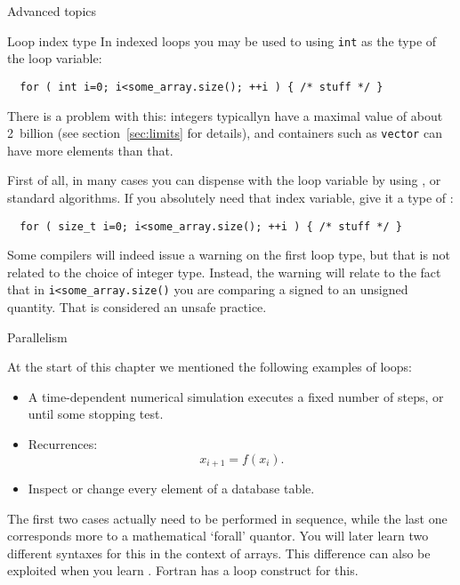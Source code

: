  {Advanced topics}
\label{sec:loop-advanced}

 {Loop index type}
\label{sec:loop-index}
In indexed loops you may be used to using \lstinline{int}
as the type of the loop variable:
\begin{lstlisting}
  for ( int i=0; i<some_array.size(); ++i ) { /* stuff */ }
\end{lstlisting}
There is a problem with this:
integers typicallyn have a maximal value of
about 2~billion (see section~\ref{sec:limits} for details),
and containers such as \lstinline{vector} can have more elements than that.

First of all, in many cases you can dispense with the loop variable
by using ,
or standard algorithms.
If you absolutely need that index variable,
give it a type of :
\begin{lstlisting}
  for ( size_t i=0; i<some_array.size(); ++i ) { /* stuff */ }
\end{lstlisting}

\begin{remark}
  Some compilers will indeed issue a warning on the first loop type,
  but that is not related to the choice of integer type.
  Instead, the warning will relate to the fact that in
  \lstinline|i<some_array.size()|
  you are comparing a signed to an unsigned quantity.
  That is considered an unsafe practice.
\end{remark}


 {Parallelism}

At the start of this chapter we mentioned the following examples of loops:
\begin{itemize}
\item A time-dependent numerical simulation executes a fixed number of
  steps, or until some stopping test.
\item Recurrences: \[ x_{i+1} = f(x_i). \]
\item Inspect or change every element of a database table.
\end{itemize}
The first two cases actually need to be performed in sequence, while
the last one corresponds more to a mathematical `forall' quantor. You
will later learn two different syntaxes for this in the context of arrays.
This
difference can also be exploited when you learn
. Fortran has a
 loop construct for this.

